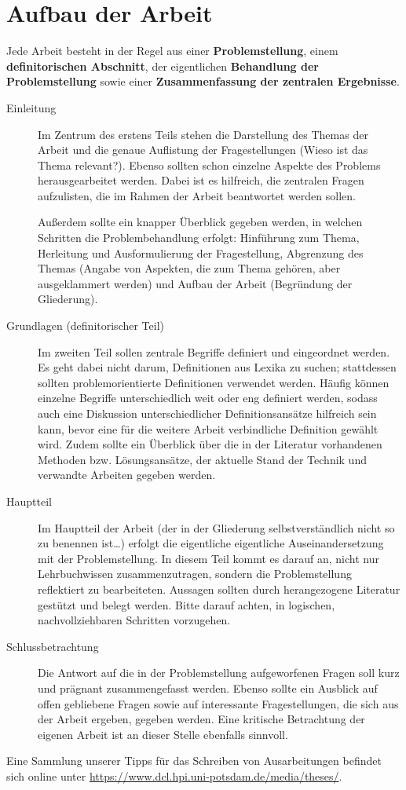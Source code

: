 \chapter{Aufbau der Arbeit}

Jede Arbeit besteht in der Regel aus einer \textbf{Problemstellung}, einem \textbf{definitorischen Abschnitt}, der eigentlichen \textbf{Behandlung der Problemstellung} sowie einer \textbf{Zusammenfassung der zentralen Ergebnisse}.

\begin{description}

	\item[Einleitung] Im Zentrum des erstens Teils stehen die Darstellung des Themas der Arbeit und die genaue Auflistung der Fragestellungen (Wieso ist das Thema relevant?). Ebenso sollten schon einzelne Aspekte des Problems herausgearbeitet werden. Dabei ist es hilfreich, die zentralen Fragen aufzulisten, die im Rahmen der Arbeit beantwortet werden sollen.
	
	Außerdem sollte ein knapper Überblick gegeben werden, in welchen Schritten die Problembehandlung erfolgt: Hinführung zum Thema, Herleitung und Ausformulierung der Fragestellung, Abgrenzung des Themas (Angabe von Aspekten, die zum Thema gehören, aber ausgeklammert werden) und Aufbau der Arbeit (Begründung der Gliederung).
	
	\item[Grundlagen (definitorischer Teil)] Im zweiten Teil sollen zentrale Begriffe definiert und eingeordnet werden. Es geht dabei nicht darum, Definitionen aus Lexika zu suchen; stattdessen sollten problemorientierte Definitionen verwendet werden. Häufig können einzelne Begriffe unterschiedlich weit oder eng definiert werden, sodass auch eine Diskussion unterschiedlicher Definitionsansätze hilfreich sein kann, bevor eine für die weitere Arbeit verbindliche Definition gewählt wird. Zudem sollte ein Überblick über die in der Literatur vorhandenen Methoden bzw. Lösungsansätze, der aktuelle Stand der Technik und verwandte Arbeiten gegeben werden.
	
	\item[Hauptteil] Im Hauptteil der Arbeit (der in der Gliederung selbstverständlich nicht so zu benennen ist\ldots) erfolgt die eigentliche eigentliche Auseinandersetzung mit der Problemstellung. In diesem Teil kommt es darauf an, nicht nur Lehrbuchwissen zusammenzutragen, sondern die Problemstellung reflektiert zu bearbeiteten. Aussagen sollten durch herangezogene Literatur gestützt und belegt werden. Bitte darauf achten, in logischen, nachvollziehbaren Schritten vorzugehen.
	
	\item[Schlussbetrachtung] Die Antwort auf die in der Problemstellung aufgeworfenen Fragen soll kurz und prägnant zusammengefasst werden. Ebenso sollte ein Ausblick auf offen gebliebene Fragen sowie auf interessante Fragestellungen, die sich aus der Arbeit ergeben, gegeben werden. Eine kritische Betrachtung der eigenen Arbeit ist an dieser Stelle ebenfalls sinnvoll.

\end{description}

\noindent
Eine Sammlung unserer Tipps für das Schreiben von Ausarbeitungen befindet sich online unter \url{https://www.dcl.hpi.uni-potsdam.de/media/theses/}.